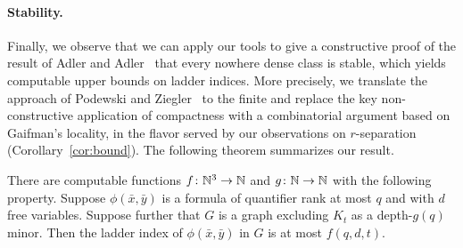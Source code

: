 \paragraph{Stability.}
Finally, we observe that we can apply our  tools to give a constructive proof of the result of Adler and Adler~\cite{adler2014interpreting}
that every nowhere dense class is stable, which yields computable upper bounds on ladder indices.
More precisely, we translate the approach of Podewski and Ziegler~\cite{podewski1978stable} to the finite
and replace the key non-constructive application of compactness with a combinatorial argument based on Gaifman's locality,
in the flavor served by our observations on $r$-separation (Corollary~\ref{cor:bound}).
The following theorem summarizes our result.

 \begin{theorem}\label{thm:new-stable}
There are computable functions $f\colon \mathbb{N}^3\to\mathbb{N}$ and $g\colon\mathbb{N}\to\mathbb{N}$ with the following property.
Suppose $\phi(\bar x,\bar y)$ is a formula of quantifier rank at most $q$ and with $d$ free variables.
Suppose further that $G$ is a graph excluding $K_t$ as a depth-$g(q)$ minor. Then the ladder index of $\phi(\bar x,\bar y)$ in $G$ is at most $f(q,d,t)$.
 \end{theorem}




